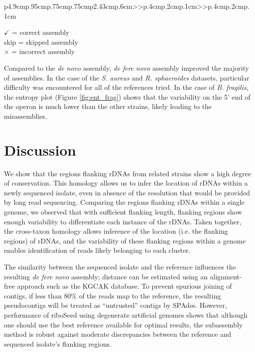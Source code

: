 \documentclass[10pt]{article}
\begin{document}
\begin{linenumbers}
\begin{table}[]
{\begin{tabular}{p{4.9cm}p{.95cm}p{.75cm}p{.75cm}p{2.43cm}p{.6cm}>{\color{black}}>{\hfill}p{.4cm}p{.2cm}p{.1cm}>{\color{black}}>{\hfill}p{.4cm}p{.2cm}p{.1cm}}
    \bottomrule
    \begin{minipage}[t]{.5\textwidth}
      {\tiny
        $\checkmark$ = correct assembly \\ skip = skipped assembly \\ $\times$ = incorrect assembly
      }
    \end{minipage}
  \end{tabular}
  }
\end{table}

Compared to the \textit{de novo} assembly, \textit{de fere novo} assembly improved the majority of assemblies. In the case of the \textit{S. aureus} and \textit{R. sphaeroides} datasets, particular difficulty was encountered for all of the references tried. In the case of \textit{B. fragilis}, the entropy plot (Figure \ref{fig:ent_frag}) shows that the variability on the 5' end of the operon is much lower than the other strains, likely leading to the misassemblies.


\section*{Discussion}
We show that the regions flanking rDNAs from related strains show a high degree of conservation. This homology allows us to infer the location of rDNAs within a newly sequenced isolate, even in absence of the resolution that would be provided by long read sequencing. Comparing the regions flanking rDNAs within a single genome, we observed that with sufficient flanking length, flanking regions show enough variability to differentiate each instance of the rDNAs. Taken together, the cross-taxon homology allows inference of the location (i.e. the flanking regions) of rDNAs, and the variability of these flanking regions within a genome enables identification of reads likely belonging to each cluster.


The similarity between the sequenced isolate and the reference influences the resulting \textit{de fere novo} assembly; distance can be estimated using an alignment-free approach such as the KGCAK database\cite{Wang2015b}. To prevent spurious joining of contigs, if less than 80\% of the reads map to the reference, the resulting pseudocontigs will be treated as ``untrusted'' contigs by SPAdes. However, performance of riboSeed using degenerate artificial genomes shows that although one should use the best reference available for optimal results, the subassembly method is robust against moderate discrepancies between the reference and sequenced isolate's flanking regions.




\end{linenumbers}
\end{document}
